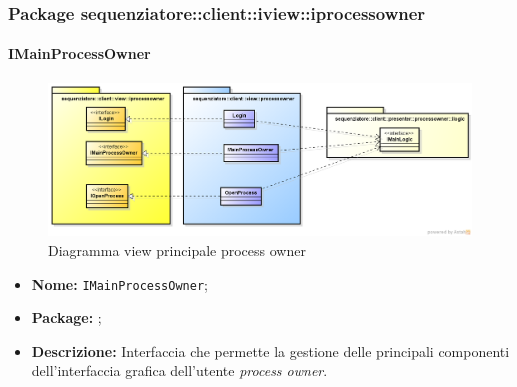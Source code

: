 \subsubsection{Package sequenziatore::client::iview::iprocessowner}

\paragraph{IMainProcessOwner}
\begin{figure}[H] \centering \includegraphics[width=%
\textwidth]
{./pack/ProcessOwner.png} \caption{Diagramma view principale process owner}
\end{figure}
\begin{itemize}
\item \textbf{Nome:} \texttt{IMainProcessOwner};
\item \textbf{Package:} \texttt{\iViewAdmin{}};
\item \textbf{Descrizione:} Interfaccia che permette la gestione delle principali componenti dell'interfaccia grafica dell'utente \textit{process owner}.
\end{itemize}

